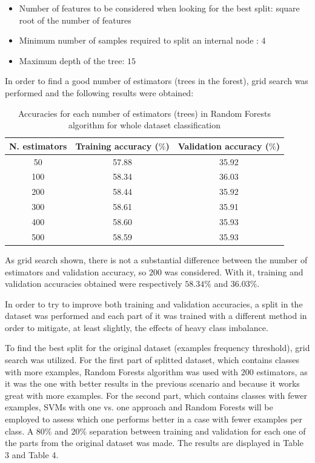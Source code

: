 \documentclass[10pt,twocolumn,letterpaper]{article}
\begin{document}
\begin{itemize}
	\item Number of features to be considered when looking for the best split: square root of the number of features
	\item Minimum number of samples required to split an internal node : $4$
	\item Maximum depth of the tree: $15$
\end{itemize}

In order to find a good number of estimators (trees in the forest), grid search was performed and the following results were obtained:

\begin{table}[h!]
  \begin{center}
    \label{tab:rf_table_whole}
    \begin{tabular}{c|c|c} %
      \textbf{N. estimators} & \textbf{Training accuracy ($\%$)} & \textbf{Validation accuracy ($\%$)}\\
      \hline
      50 & 57.88 & 35.92\\
      100 & 58.34 & 36.03\\
      200 & 58.44 & 35.92\\
      300 & 58.61 & 35.91\\
      400 & 58.60 & 35.93\\
      500 & 58.59 & 35.93\\
    \end{tabular}
    \caption{Accuracies for each number of estimators (trees) in Random Forests algorithm for whole dataset classification}
  \end{center}
\end{table}

As grid search shown, there is not a substantial difference between the number of estimators and validation accuracy, so $200$ was considered. With it, training and validation accuracies obtained were respectively $58.34\%$ and $36.03\%$.
 
In order to try to improve both training and validation accuracies, a split in the dataset was performed and each part of it was trained with a different method in order to mitigate, at least slightly, the effects of heavy class imbalance.

To find the best split for the original dataset (examples frequency threshold), grid search was utilized. For the first part of splitted dataset, which contains classes with more examples, Random Forests algorithm was used with $200$ estimators, as it was the one with better results in the previous scenario and because it works great with more examples. For the second part, which contains classes with fewer examples, SVMs with one vs. one approach and Random Forests will be employed to assess which one performs better in a case with fewer examples per class. A $80\%$ and $20\%$ separation between training and validation for each one of the parts from the original dataset was made. The results are displayed in Table 3 and Table 4.
\end{document}
